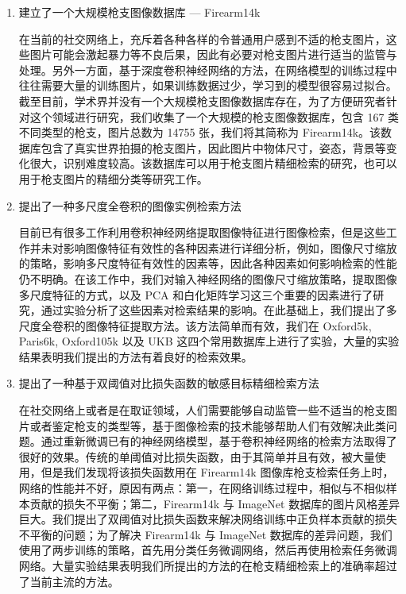 \begin{enumerate}
\item 建立了一个大规模枪支图像数据库 --- Firearm14k

在当前的社交网络上，充斥着各种各样的令普通用户感到不适的枪支图片，这些图片可能会激起暴力等不良后果，因此有必要对枪支图片进行适当的监管与处理。另外一方面，基于深度卷积神经网络的方法，在网络模型的训练过程中往往需要大量的训练图片，如果训练数据过少，学习到的模型很容易过拟合。截至目前，学术界并没有一个大规模枪支图像数据库存在，为了方便研究者针对这个领域进行研究，我们收集了一个大规模的枪支图像数据库，包含 167 类不同类型的枪支，图片总数为 14755 张，我们将其简称为 Firearm14k。该数据库包含了真实世界拍摄的枪支图片，因此图片中物体尺寸，姿态，背景等变化很大，识别难度较高。该数据库可以用于枪支图片精细检索的研究，也可以用于枪支图片的精细分类等研究工作。

\item 提出了一种多尺度全卷积的图像实例检索方法

目前已有很多工作利用卷积神经网络提取图像特征进行图像检索，但是这些工作并未对影响图像特征有效性的各种因素进行详细分析，例如，图像尺寸缩放的策略，影响多尺度特征有效性的因素等，因此各种因素如何影响检索的性能仍不明确。在该工作中，我们对输入神经网络的图像尺寸缩放策略，提取图像多尺度特征的方式，以及 PCA 和白化矩阵学习这三个重要的因素进行了研究，通过实验分析了这些因素对检索结果的影响。在此基础上，我们提出了多尺度全卷积的图像特征提取方法。该方法简单而有效，我们在 Oxford5k, Paris6k, Oxford105k 以及 UKB 这四个常用数据库上进行了实验，大量的实验结果表明我们提出的方法有着良好的检索效果。

\item 提出了一种基于双阈值对比损失函数的敏感目标精细检索方法

在社交网络上或者是在取证领域，人们需要能够自动监管一些不适当的枪支图片或者鉴定枪支的类型等，基于图像检索的技术能够帮助人们有效解决此类问题。通过重新微调已有的神经网络模型，基于卷积神经网络的检索方法取得了很好的效果。传统的单阈值对比损失函数，由于其简单并且有效，被大量使用，但是我们发现将该损失函数用在 Firearm14k 图像库枪支检索任务上时，网络的性能并不好，原因有两点：第一，在网络训练过程中，相似与不相似样本贡献的损失不平衡；第二，Firearm14k 与 ImageNet 数据库的图片风格差异巨大。我们提出了双阈值对比损失函数来解决网络训练中正负样本贡献的损失不平衡的问题；为了解决 Firearm14k 与 ImageNet 数据库的差异问题，我们使用了两步训练的策略，首先用分类任务微调网络，然后再使用检索任务微调网络。大量实验结果表明我们所提出的方法的在枪支精细检索上的准确率超过了当前主流的方法。

\end{enumerate}

